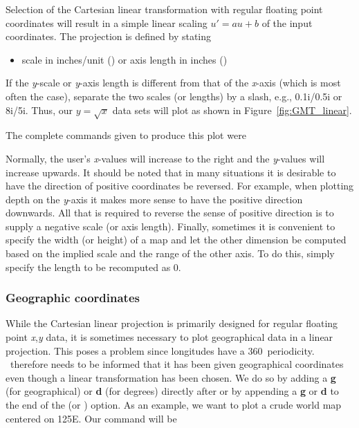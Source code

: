 Selection of the Cartesian linear transformation with regular floating point coordinates
will result in a simple linear scaling $u' = au + b$ of the input coordinates.  The projection
is defined by stating

\begin{itemize}
\item scale in inches/unit () or axis length in inches ()
\end{itemize}

If the \emph{y}-scale or \emph{y}-axis length is different from that of
the \emph{x}-axis (which is most often the case), separate the two
scales (or lengths) by a slash, e.g., 0.1i/0.5i or 8i/5i. 
Thus, our $y = \sqrt{x}$ data sets will plot as shown in Figure~\ref{fig:GMT_linear}.


The complete commands given to produce this plot were 


\noindent
Normally, the user's \emph{x}-values will increase to the right
and the \emph{y}-values will increase upwards.  It should be noted
that in many situations it is desirable to have the direction of
positive coordinates be reversed.  For example, when plotting
depth on the \emph{y}-axis it makes more sense to have the positive
direction downwards.  All that is required to reverse the sense of
positive direction is to supply a negative scale (or axis length).
Finally, sometimes it is convenient to specify the width (or height)
of a map and let the other dimension be computed based on the implied
scale and the range of the other axis.  To do this, simply specify
the length to be recomputed as 0.

\subsubsection{Geographic coordinates}
\label{sec:linear}


While the Cartesian linear projection is primarily designed for regular floating point
\emph{x},\emph{y} data, it is sometimes necessary to plot geographical
data in a linear projection.  This poses a problem since longitudes
have a 360\DS\ periodicity.  \GMT\ therefore needs to be informed
that it has been given geographical coordinates even though a linear transformation
has been chosen.  We do so by adding a \textbf{g} (for geographical) or \textbf{d} (for degrees)
directly after  or by appending a \textbf{g} or \textbf{d} to
the end of the  (or ) option.  As an example, we
want to plot a crude world map centered on 125\DS E.  Our command will be 

